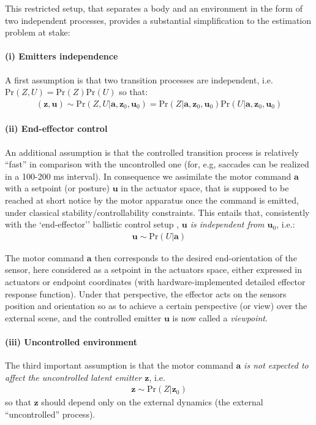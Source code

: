 \documentclass[12pt,twoside,openright]{article}
\begin{document}
This restricted setup, that separates a body and an environment in the form of two {\color{Purple}independent} processes,  provides a substantial simplification to the estimation problem at stake: 
\paragraph{(i) Emitters independence}
A first assumption is that two {\color{Purple} transition processes} are independent, i.e. $\text{Pr}(Z,U) = \text{Pr}(Z)\text{Pr}(U)$ so that:
\begin{align}
(\boldsymbol{z},\boldsymbol{u}) \sim \text{Pr}(Z,U|\boldsymbol{a}, \boldsymbol{z}_0, \boldsymbol{u}_0) = \text{Pr}(Z|\boldsymbol{a}, \boldsymbol{z}_0, \boldsymbol{u}_0) \text{Pr}(U|\boldsymbol{a}, \boldsymbol{z}_0, \boldsymbol{u}_0)\nonumber
\end{align}
	
\paragraph{(ii) End-effector control}
An additional assumption is that the controlled {\color{Purple} transition} process is relatively ``fast'' in comparison with the uncontrolled one
(for, e.g, saccades can be realized in a 100-200 ms interval). 
In consequence we assimilate the motor command $\boldsymbol{a}$ with a setpoint (or posture) $\boldsymbol{u}$ in the actuator space, that is supposed to be reached 
at short notice by the motor apparatus once the command is emitted, under classical stability/controllability constraints.
This entails that, consistently with the `end-effector'' ballistic control setup \citep{mussa2004neural},  \emph{$\boldsymbol{u}$ is independent from $\boldsymbol{u}_0$},
i.e.:
\begin{align*}
\boldsymbol{u}\sim\text{Pr}(U|\boldsymbol{a})
\end{align*}

The motor command $\boldsymbol{a}$ then corresponds to the desired end-orientation of the sensor,
here considered as a setpoint in the actuators space, 
either expressed in actuators or endpoint coordinates (with hardware-implemented detailed effector response function).  
Under that perspective, the effector acts on the sensors position and orientation so as to achieve a certain perspective (or view) over the external scene, and the controlled emitter $\boldsymbol{u}$ is now called a \emph{viewpoint}. 

\paragraph{(iii) Uncontrolled environment}
The third important assumption is that the motor command $\boldsymbol{a}$ \emph{is not expected to affect the uncontrolled latent emitter $\boldsymbol{z}$}, i.e.
\begin{align*}
\boldsymbol{z} \sim \text{Pr}(Z|\boldsymbol{z}_0)
\end{align*}
so that $\boldsymbol{z}$ should depend only on the external dynamics (the external ``uncontrolled'' process).
\end{document}
